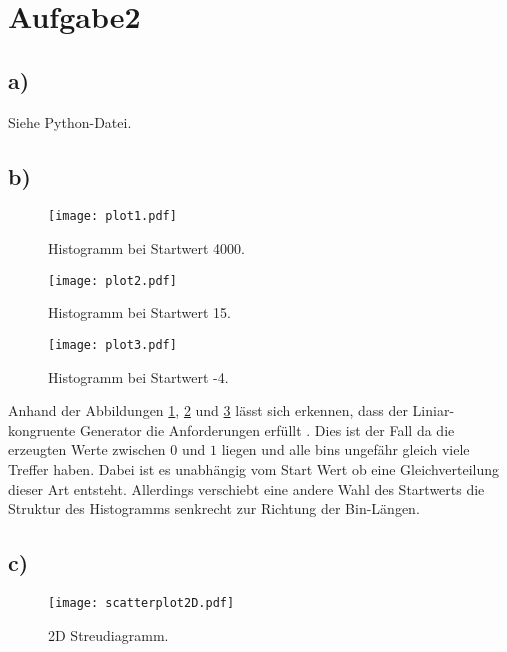 \newpage
\section{Aufgabe2}
\label{sec:a2}



\subsection{a)}
\label{subsec:a2a}

Siehe Python-Datei.

\subsection{b)}
\label{subsec:a2b}

\FloatBarrier
\begin{figure}
  \centering
  \texttt{[image: plot1.pdf]}
  \caption{Histogramm bei Startwert 4000.}
  \label{fig:a2p1}
\end{figure}
\FloatBarrier

\FloatBarrier
\begin{figure}
  \centering
  \texttt{[image: plot2.pdf]}
  \caption{Histogramm bei Startwert 15.}
  \label{fig:a2p2}
\end{figure}
\FloatBarrier

\FloatBarrier
\begin{figure}
  \centering
  \texttt{[image: plot3.pdf]}
  \caption{Histogramm bei Startwert -4.}
  \label{fig:a2p3}
\end{figure}
\FloatBarrier
Anhand der Abbildungen \ref{fig:a2p1}, \ref{fig:a2p2} und \ref{fig:a2p3} lässt sich erkennen,
dass der Liniar-kongruente Generator die Anforderungen erfüllt . Dies ist der Fall da die erzeugten Werte zwischen $0$ und $1$ liegen und alle bins ungefähr gleich viele Treffer haben.
Dabei ist es unabhängig vom Start Wert ob eine Gleichverteilung dieser Art entsteht. Allerdings verschiebt eine andere Wahl des Startwerts die Struktur des Histogramms senkrecht zur
Richtung der Bin-Längen.

\subsection{c)}
\label{subsec:a2c}

\FloatBarrier
\begin{figure}
  \centering
  \texttt{[image: scatterplot2D.pdf]}
  \caption{2D Streudiagramm.}
  \label{fig:a2p4}
\end{figure}
\FloatBarrier

